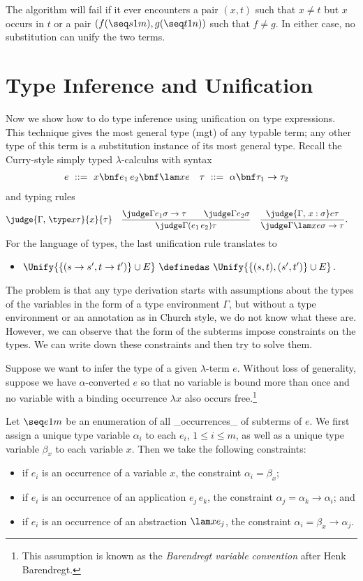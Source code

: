 The algorithm will fail if it ever encounters a pair $(x,t)$ such that $x\neq t$ but $x$ occurs in $t$ or a pair $(f(\seq s1m),g(\seq t1n))$ such that $f\neq g$. In either case, no substitution can unify the two terms.

\section{Type Inference and Unification}

Now we show how to do type inference using unification on type expressions. This technique gives the most general type (mgt) of any typable term; any other type of this term is a substitution instance of its most general type. Recall the Curry-style simply typed $\lambda$-calculus with syntax
\begin{align*}
& e\ ::=\ x \bnf e_1\,e_2 \bnf \lam xe && \tau\ ::=\ \alpha \bnf \tau_1\to\tau_2
\end{align*}
and typing rules
\begin{align*}
& \judge{\Gamma,\,\type x\tau}{x}{\tau}
&& \frac{\judge\Gamma{e_1}{\sigma\to\tau}\qquad\judge\Gamma{e_2}\sigma}{\judge\Gamma{(e_1\,e_2)}\tau}
&& \frac{\judge{\Gamma,\,x:\sigma}e\tau}{\judge\Gamma{\lam xe}{\sigma\to\tau}}.
\end{align*}
For the language of types, the last unification rule translates to
\begin{itemize}
\item
$\Unify{\{(s\to s',t\to t')\}\cup E}\ \definedas\ \Unify{\{(s,t),(s',t')\}\cup E}$.
\end{itemize}

The problem is that any type derivation starts with assumptions about the types of the variables in the form of a type environment $\Gamma$, but without a type environment or an annotation as in Church style, we do not know what these are. However, we can observe that the form of the subterms impose constraints on the types. We can write down these constraints and then try to solve them.

Suppose we want to infer the type of a given $\lambda$-term $e$. Without loss of generality, suppose we have $\alpha$-converted $e$ so that no variable is bound more than once and no variable with a binding occurrence $\lambda x$ also occurs free.\footnote{This assumption is known as the \emph{Barendregt variable convention} after Henk Barendregt.}

Let $\seq e1m$ be an enumeration of all _occurrences_ of subterms of $e$. We first assign a unique type variable $\alpha_i$ to each $e_i$, $1\leq i\leq m$, as well as a unique type variable $\beta_x$ to each variable $x$. Then we take the following constraints:
\begin{itemize}
\item
if $e_i$ is an occurrence of a variable $x$, the constraint $\alpha_i = \beta_x$;
\item
if $e_i$ is an occurrence of an application $e_j\,e_k$, the constraint $\alpha_j = \alpha_k\to\alpha_i$; and
\item
if $e_i$ is an occurrence of an abstraction $\lam x{e_j}$, the constraint $\alpha_i = \beta_x\to\alpha_j$.
\end{itemize}

